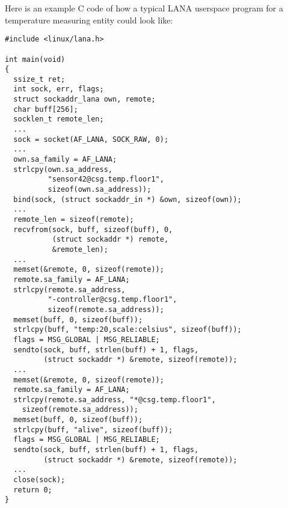 \documentclass[times,10pt,twocolumn]{article}
\begin{document}
Here is an example C code of how a typical LANA userspace program 
for a temperature measuring entity could look like:\newline

\scriptsize{
\lstset{language=C}
\begin{lstlisting}
#include <linux/lana.h>

int main(void)
{
  ssize_t ret;
  int sock, err, flags;
  struct sockaddr_lana own, remote;
  char buff[256];
  socklen_t remote_len;
  ...
  sock = socket(AF_LANA, SOCK_RAW, 0);
  ...
  own.sa_family = AF_LANA;
  strlcpy(own.sa_address,
          "sensor42@csg.temp.floor1",
          sizeof(own.sa_address));
  bind(sock, (struct sockaddr_in *) &own, sizeof(own));
  ...
  remote_len = sizeof(remote);
  recvfrom(sock, buff, sizeof(buff), 0,
           (struct sockaddr *) remote,
           &remote_len);
  ...
  memset(&remote, 0, sizeof(remote));
  remote.sa_family = AF_LANA;
  strlcpy(remote.sa_address,
          "-controller@csg.temp.floor1",
          sizeof(remote.sa_address));
  memset(buff, 0, sizeof(buff));
  strlcpy(buff, "temp:20,scale:celsius", sizeof(buff));
  flags = MSG_GLOBAL | MSG_RELIABLE;
  sendto(sock, buff, strlen(buff) + 1, flags,
         (struct sockaddr *) &remote, sizeof(remote));
  ...
  memset(&remote, 0, sizeof(remote));
  remote.sa_family = AF_LANA;
  strlcpy(remote.sa_address, "*@csg.temp.floor1",
  	sizeof(remote.sa_address));
  memset(buff, 0, sizeof(buff));
  strlcpy(buff, "alive", sizeof(buff));
  flags = MSG_GLOBAL | MSG_RELIABLE;
  sendto(sock, buff, strlen(buff) + 1, flags,
         (struct sockaddr *) &remote, sizeof(remote));
  ...
  close(sock);
  return 0;
}
\end{lstlisting}
}
\normalsize

\nocite{*}


\end{document}
